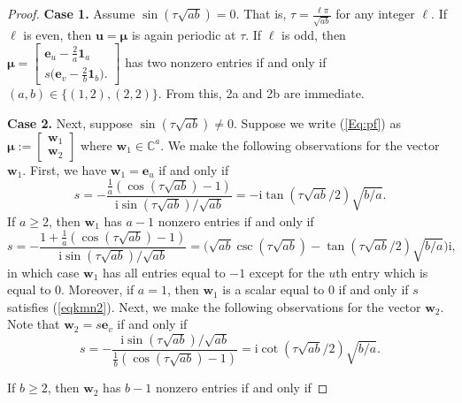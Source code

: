 \documentclass{article}
\numberwithin{equation}{section}
\newcommand{\uno}{\mathbf 1}
\newcommand{\be}{\mathbf e}
\newcommand{\bu}{\mathbf u}
\newcommand{\bw}{\mathbf w}
\newcommand{\bmu}{{\boldsymbol{\mu}}}
\def\C{\mathbb{C}}
\def\ii{\mathrm{i}}
\begin{document}
{\begin{proof}
\noindent \textbf{Case 1.} Assume $\sin( \tau\sqrt{ab})=0$. That is, $\tau=\frac{\ell\pi}{\sqrt{ab}}$ for any integer $\ell$. If $\ell$ is even, then $\bu=\bmu$ is again periodic at $\tau$. If $\ell$ is odd, then 
$\bmu=\begin{bmatrix}
\be_u-\frac{2}{a}\uno_a \\ s\big(\be_v-\frac{2}{b}\uno_b\big).
\end{bmatrix}$ has two nonzero entries if and only if $(a,b)\in\{(1,2),(2,2)\}$. From this, 2a and 2b are immediate. 

\noindent \textbf{Case 2.} Next, suppose $\sin( \tau\sqrt{ab})\neq 0$. 
Suppose we write (\ref{Eq:pf}) as $\bmu:=\begin{bmatrix}
\bw_1 \\ \bw_2\end{bmatrix}$ where $\bw_1\in\C^a$. We make the following observations for the vector $\bw_1$. First, we have $\bw_1=\be_u$ if and only if 
\begin{equation}
\label{eqkmn1}
s=-\frac{\frac{1}{a}(\cos(\tau\sqrt{ab})-1)}{\ii\sin(\tau\sqrt{ab})/\sqrt{ab}}=-\ii \tan(\tau\sqrt{ab}/2)\sqrt{b/a}.
\end{equation}
If $a\geq 2$, then $\bw_1$ has $a-1$ nonzero entries if and only if 
\begin{equation}
\label{eqkmn2}
s=-\frac{1+\frac{1}{a}(\cos(\tau\sqrt{ab})-1)}{\ii\sin(\tau\sqrt{ab})/\sqrt{ab}}=\bigg(\sqrt{ab}\csc(\tau\sqrt{ab})-\tan(\tau\sqrt{ab}/2)\sqrt{b/a}\bigg)\ii,
\end{equation}
in which case $\bw_1$ has all entries equal to $-1$
except for the $u$th entry which is equal to 0. Moreover, if $a=1$, then $\bw_1$ is a scalar equal to 0 if and only if $s$ satisfies (\ref{eqkmn2}). Next, we make the following observations for the vector $\bw_2$. Note that $\bw_2=s\be_v$ if and only if 
\begin{equation}
\label{eqkmn3}
s=-\frac{\ii\sin(\tau\sqrt{ab})/\sqrt{ab}}{\frac{1}{b}(\cos(\tau\sqrt{ab})-1)}=\ii \cot(\tau\sqrt{ab}/2)\sqrt{b/a}.
\end{equation}
\item If $b\geq 2$, then $\bw_2$ has $b-1$ nonzero entries if and only if 

\end{proof}}
\end{document}
